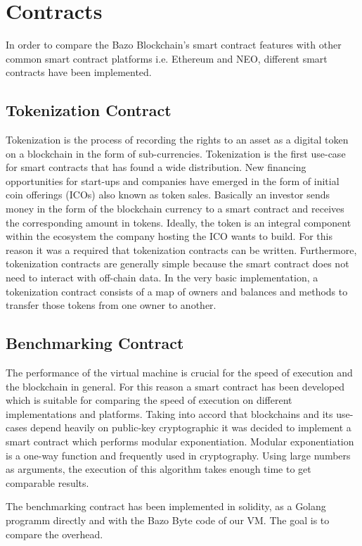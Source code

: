 
\section{Contracts}
In order to compare the Bazo Blockchain's smart contract features with other common smart contract platforms i.e. Ethereum and NEO, different smart contracts have been implemented.

\subsection{Tokenization Contract}
Tokenization is the process of recording the rights to an asset as a digital token on a blockchain in the form of sub-currencies. \cite{eth_whitepaper} Tokenization is the first use-case for smart contracts that has found a wide distribution. New financing opportunities for start-ups and companies have emerged in the form of initial coin offerings (ICOs) also known as token sales. Basically an investor sends money in the form of the blockchain currency to a smart contract and receives the corresponding amount in tokens. Ideally, the token is an integral component within the ecosystem the company hosting the ICO wants to build. For this reason it was a required that tokenization contracts can be written. Furthermore, tokenization contracts are generally simple because the smart contract does not need to interact with off-chain data. In the very basic implementation, a tokenization contract consists of a map of owners and balances and methods to transfer those tokens from one owner to another.

\subsection{Benchmarking Contract}
The performance of the virtual machine is crucial for the speed of execution and the blockchain in general. For this reason a smart contract has been developed which is suitable for comparing the speed of execution on different implementations and platforms. Taking into accord that blockchains and its use-cases depend heavily on public-key cryptographic it was decided to implement a smart contract which performs modular exponentiation. Modular exponentiation is a one-way function and frequently used in cryptography. Using large numbers as arguments, the execution of this algorithm takes enough time to get comparable results. 

The benchmarking contract has been implemented in solidity, as a Golang programm directly and with the Bazo Byte code of our VM. The goal is to compare the overhead.
